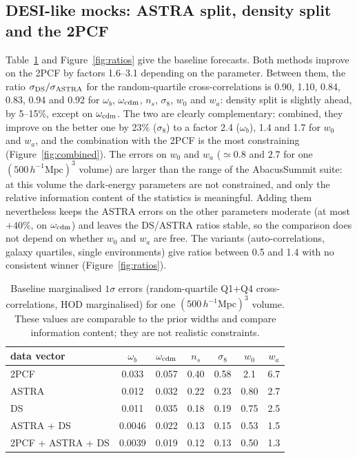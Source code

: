 \documentclass[11pt,twocolumn]{article}
\newcommand{\Mpch}{\,h^{-1}\mathrm{Mpc}}
\begin{document}
\subsection{DESI-like mocks: ASTRA split, density split and the 2PCF}

Table~\ref{tab:sigma} and Figure~\ref{fig:ratios} give the baseline forecasts. Both methods improve on the 2PCF by factors 1.6--3.1 depending on the parameter. Between them, the ratio $\sigma_{\rm DS}/\sigma_{\rm ASTRA}$ for the random-quartile cross-correlations is 0.90, 1.10, 0.84, 0.83, 0.94 and 0.92 for $\omega_b$, $\omega_{\rm cdm}$, $n_s$, $\sigma_8$, $w_0$ and $w_a$: density split is slightly ahead, by 5--15\%, except on $\omega_{\rm cdm}$. The two are clearly complementary: combined, they improve on the better one by 23\% ($\sigma_8$) to a factor 2.4 ($\omega_b$), 1.4 and 1.7 for $w_0$ and $w_a$, and the combination with the 2PCF is the most constraining (Figure~\ref{fig:combined}). The errors on $w_0$ and $w_a$ ($\simeq0.8$ and $2.7$ for one $(500\Mpch)^3$ volume) are larger than the range of the AbacusSummit suite: at this volume the dark-energy parameters are not constrained, and only the relative information content of the statistics is meaningful. Adding them nevertheless keeps the ASTRA errors on the other parameters moderate (at most $+40\%$, on $\omega_{\rm cdm}$) and leaves the DS/ASTRA ratios stable, so the comparison does not depend on whether $w_0$ and $w_a$ are free. The variants (auto-correlations, galaxy quartiles, single environments) give ratios between 0.5 and 1.4 with no consistent winner (Figure~\ref{fig:ratios}).

\begin{table}[!htbp]
\centering\small
\begin{tabular}{lcccccc}
\toprule
data vector & $\omega_b$ & $\omega_{\rm cdm}$ & $n_s$ & $\sigma_8$ & $w_0$ & $w_a$ \\
\midrule
2PCF & 0.033 & 0.057 & 0.40 & 0.58 & 2.1 & 6.7 \\
ASTRA & 0.012 & 0.032 & 0.22 & 0.23 & 0.80 & 2.7 \\
DS & 0.011 & 0.035 & 0.18 & 0.19 & 0.75 & 2.5 \\
ASTRA + DS & 0.0046 & 0.022 & 0.13 & 0.15 & 0.53 & 1.5 \\
2PCF + ASTRA + DS & 0.0039 & 0.019 & 0.12 & 0.13 & 0.50 & 1.3 \\
\bottomrule
\end{tabular}
\caption{Baseline marginalised $1\sigma$ errors (random-quartile Q1+Q4 cross-correlations, HOD marginalised) for one $(500\Mpch)^3$ volume. These values are comparable to the prior widths and compare information content; they are not realistic constraints.}
\label{tab:sigma}
\end{table}
\end{document}
